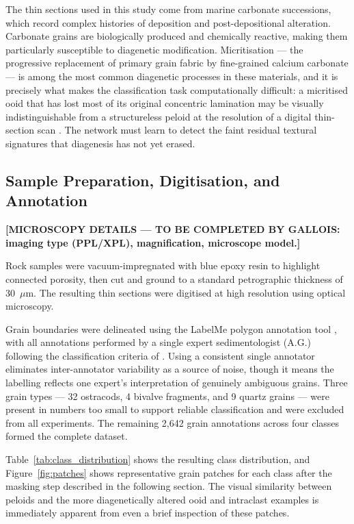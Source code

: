 \documentclass[a4paper,fleqn]{cas-dc}
\begin{document}
The thin sections used in this study come from marine carbonate successions, which record complex histories of deposition and post-depositional alteration. Carbonate grains are biologically produced and chemically reactive, making them particularly susceptible to diagenetic modification. Micritisation --- the progressive replacement of primary grain fabric by fine-grained calcium carbonate --- is among the most common diagenetic processes in these materials, and it is precisely what makes the classification task computationally difficult: a micritised ooid that has lost most of its original concentric lamination may be visually indistinguishable from a structureless peloid at the resolution of a digital thin-section scan \citep{flugel2010}. The network must learn to detect the faint residual textural signatures that diagenesis has not yet erased.

\subsection{Sample Preparation, Digitisation, and Annotation}
\textbf{[MICROSCOPY DETAILS --- TO BE COMPLETED BY GALLOIS: imaging type (PPL/XPL), magnification, microscope model.]}

Rock samples were vacuum-impregnated with blue epoxy resin to highlight connected porosity, then cut and ground to a standard petrographic thickness of 30~$\mu$m. The resulting thin sections were digitised at high resolution using optical microscopy.

Grain boundaries were delineated using the LabelMe polygon annotation tool \citep{labelme}, with all annotations performed by a single expert sedimentologist (A.G.) following the classification criteria of \citet{flugel2010}. Using a consistent single annotator eliminates inter-annotator variability as a source of noise, though it means the labelling reflects one expert's interpretation of genuinely ambiguous grains. Three grain types --- 32 ostracods, 4 bivalve fragments, and 9 quartz grains --- were present in numbers too small to support reliable classification and were excluded from all experiments. The remaining 2,642 grain annotations across four classes formed the complete dataset.

Table~\ref{tab:class_distribution} shows the resulting class distribution, and Figure~\ref{fig:patches} shows representative grain patches for each class after the masking step described in the following section. The visual similarity between peloids and the more diagenetically altered ooid and intraclast examples is immediately apparent from even a brief inspection of these patches.
\end{document}
